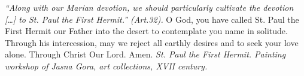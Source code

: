 \pagestyle{empty}
\hspace{0pt}
\vfill

\textit{``Along with our Marian devotion, we should particularly cultivate the devotion [\ldots] to St. Paul the First Hermit.'' (Art.32). }
\medbreak
O God, you have called St. Paul the First Hermit our 
Father into the desert to contemplate you name in solitude. Through
his intercession, may we reject all earthly desires and to seek your
love alone. Through Christ Our Lord. Amen.
\vfill
\textit{St. Paul the First Hermit. Painting workshop of Jasna Gora, art
collections, XVII century.}
\hspace{0pt}
\newpage
